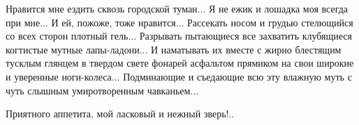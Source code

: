Нравится мне ездить сквозь городской туман... Я не ежик и лошадка моя всегда при
мне... И ей, пожоже, тоже нравится... Рассекать носом и грудью стелющийся со всех
сторон плотный гель... Разрывать пытающиеся все захватить клубящиеся когтистые
мутные лапы-ладони... И наматывать их вместе с жирно блестящим тусклым глянцем в
твердом свете фонарей асфальтом прямиком на свои широкие и уверенные
ноги-колеса... Подминающие и съедающие всю эту влажную муть с чуть слышным
умиротворенным чавканьем...

Приятного аппетита, мой ласковый и нежный зверь!..

